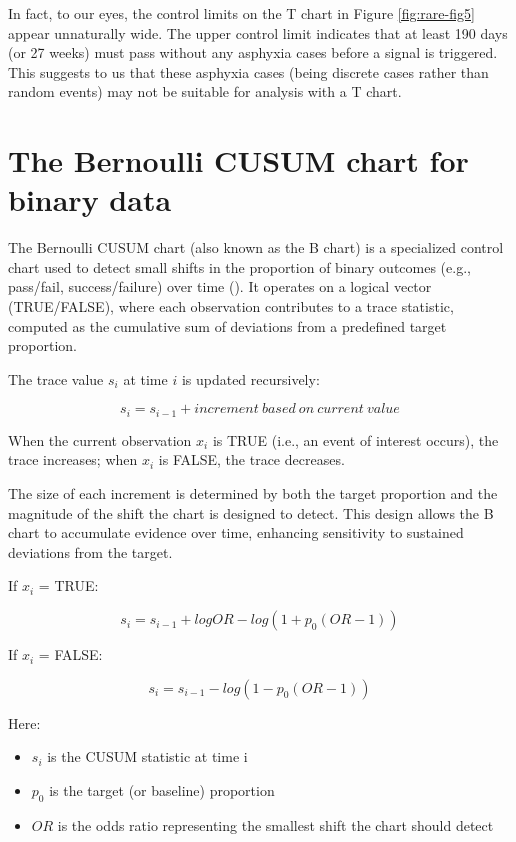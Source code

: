 \documentclass[
]{book}
\providecommand{\tightlist}{%
  \setlength{\itemsep}{0pt}\setlength{\parskip}{0pt}}
\begin{document}
In fact, to our eyes, the control limits on the T chart in Figure \ref{fig:rare-fig5} appear unnaturally wide. The upper control limit indicates that at least 190 days (or 27 weeks) must pass without any asphyxia cases before a signal is triggered. This suggests to us that these asphyxia cases (being discrete cases rather than random events) may not be suitable for analysis with a T chart.

\section{The Bernoulli CUSUM chart for binary data}\label{the-bernoulli-cusum-chart-for-binary-data}

The Bernoulli CUSUM chart (also known as the B chart) is a specialized control chart used to detect small shifts in the proportion of binary outcomes (e.g., pass/fail, success/failure) over time (). It operates on a logical vector (TRUE/FALSE), where each observation contributes to a trace statistic, computed as the cumulative sum of deviations from a predefined target proportion.

The trace value \(s_i\) at time \(i\) is updated recursively:

\[s_i=s_{i-1}+ increment\ based\ on\ current\ value\]

When the current observation \(x_i\) is TRUE (i.e., an event of interest occurs), the trace increases; when \(x_i\) is FALSE, the trace decreases.

The size of each increment is determined by both the target proportion and the magnitude of the shift the chart is designed to detect. This design allows the B chart to accumulate evidence over time, enhancing sensitivity to sustained deviations from the target.

If \(x_i\) = TRUE:

\[s_i=s_{i-1}+logOR-log(1+p_0(OR-1))\]

If \(x_i\) = FALSE:

\[s_i=s_{i-1}-log(1-p_0(OR-1))\]

Here:

\begin{itemize}
\tightlist
\item
  \(s_i\) is the CUSUM statistic at time i
\item
  \(p_0\) is the target (or baseline) proportion
\item
  \(OR\) is the odds ratio representing the smallest shift the chart should detect
\end{itemize}
\end{document}
